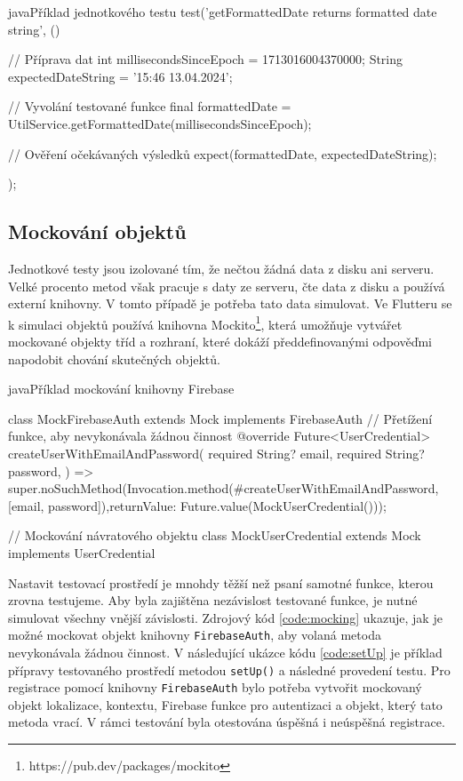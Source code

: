 \documentclass[czech, bc, kiv, he, iso690numb]{fasthesis}
\begin{document}
\newpage

\begin{code}{java}{Příklad jednotkového testu \label{code:unitTest}}
 test('getFormattedDate returns formatted date string', () {
      // Příprava dat
      int millisecondsSinceEpoch = 1713016004370000;
      String expectedDateString = '15:46 13.04.2024';

      // Vyvolání testované funkce
      final formattedDate = UtilService.getFormattedDate(millisecondsSinceEpoch);

      // Ověření očekávaných výsledků
      expect(formattedDate, expectedDateString);
    });
\end{code}

\subsection{Mockování objektů}

Jednotkové testy jsou izolované tím, že nečtou žádná data z disku ani serveru. Velké procento metod však pracuje s daty ze serveru, čte data z disku a používá externí knihovny. V tomto případě je potřeba tato data simulovat. Ve Flutteru se k simulaci objektů používá knihovna Mockito\footnote{https://pub.dev/packages/mockito}, která umožňuje vytvářet mockované objekty tříd a rozhraní, které dokáží předdefinovanými odpověďmi napodobit chování skutečných objektů.

\begin{code}{java}{Příklad mockování knihovny Firebase \label{code:mocking}}

class MockFirebaseAuth extends Mock implements FirebaseAuth {
  // Přetížení funkce, aby nevykonávala žádnou činnost
  @override
  Future<UserCredential> createUserWithEmailAndPassword({
    required String? email,
    required String? password,
  }) => super.noSuchMethod(Invocation.method(#createUserWithEmailAndPassword, [email, password]),returnValue: Future.value(MockUserCredential()));
}

// Mockování návratového objektu
class MockUserCredential extends Mock implements UserCredential {}
\end{code}

Nastavit testovací prostředí je mnohdy těžší než psaní samotné funkce, kterou zrovna testujeme. Aby byla zajištěna nezávislost testované funkce, je nutné simulovat všechny vnější závislosti. Zdrojový kód \ref{code:mocking} ukazuje, jak je možné mockovat objekt knihovny \texttt{FirebaseAuth}, aby volaná metoda nevykonávala žádnou činnost. V následující ukázce kódu \ref{code:setUp} je příklad přípravy testovaného prostředí metodou \texttt{setUp()} a následné provedení testu. Pro registrace pomocí knihovny \texttt{FirebaseAuth} bylo potřeba vytvořit mockovaný objekt lokalizace, kontextu, Firebase funkce pro autentizaci a objekt, který tato metoda vrací. V rámci testování byla otestována úspěšná i neúspěšná registrace. 
\end{document}
